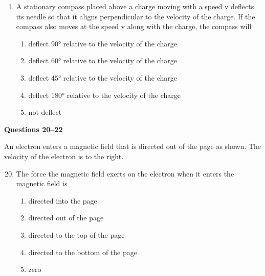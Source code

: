 \documentclass{../../oss-apphys}
\begin{document}
\begin{multicols}{2}
\begin{enumerate}[leftmargin=18pt]
  \item A stationary compass placed above a charge moving with a speed v
    deflects its needle so that it aligns perpendicular to the velocity of the
    charge. If the compass also moves at the speed v along with the charge,
    the compass will
    \begin{enumerate}[noitemsep,topsep=0pt,leftmargin=18pt,label=(\Alph*)]
    \item deflect \ang{90} relative to the velocity of the charge
    \item deflect \ang{60} relative to the velocity of the charge
    \item deflect \ang{45} relative to the velocity of the charge
    \item deflect \ang{180} relative to the velocity of the charge
    \item not deflect
    \end{enumerate}    
  \end{enumerate}


  \textbf{Questions 20--22}
  
  An electron enters a magnetic field that is directed out of the page as shown.
  The velocity of the electron is to the right.
  \begin{center}
  \end{center}

  \begin{enumerate}[leftmargin=18pt]
    \setcounter{enumi}{19}
  \item The force the magnetic field exerts on the electron when it enters the
    magnetic field is
    \begin{enumerate}[noitemsep,topsep=0pt,leftmargin=18pt,label=(\Alph*)]
    \item directed into the page
    \item directed out of the page
    \item directed to the top of the page
    \item directed to the bottom of the page
    \item zero
    \end{enumerate}


\end{enumerate}
\end{multicols}
\end{document}
